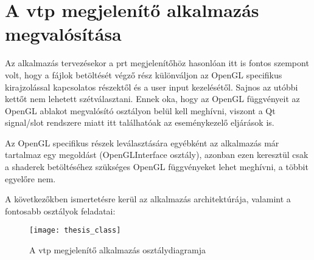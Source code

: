 \section{A vtp megjelenítő alkalmazás megvalósítása}

Az alkalmazás tervezésekor a prt megjelenítőhöz hasonlóan 
itt is fontos szempont volt, 
hogy a fájlok betöltését végző rész különváljon 
az OpenGL specifikus kirajzolással kapcsolatos részektől 
és a user input kezelésétől. 
Sajnos az utóbbi kettőt nem lehetett szétválasztani. 
Ennek oka, hogy az OpenGL függvényeit 
az OpenGL ablakot megvalósító osztályon belül kell meghívni, 
viszont a Qt signal/slot rendszere miatt itt találhatóak 
az eseménykezelő eljárások is. 

Az OpenGL specifikus részek leválasztására egyébként 
az alkalmazás már tartalmaz egy megoldást ({\ttfamily OpenGLInterface} osztály), 
azonban ezen keresztül csak 
a shaderek betöltéséhez szükséges OpenGL függvényeket lehet meghívni, 
a többit egyelőre nem.

A következőkben ismertetésre kerül az alkalmazás architektúrája, 
valamint a fontosabb osztályok feladatai:

\begin{figure}[!htb]
\centering
\texttt{[image: thesis\_class]}
\caption{A vtp megjelenítő alkalmazás osztálydiagramja}
\label{fig:x thesis_class}
\end{figure}

